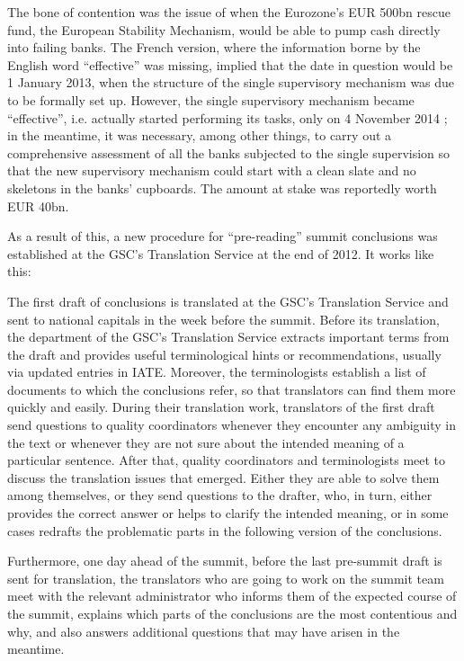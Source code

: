 \documentclass[output=paper]{langsci/langscibook}
\begin{document}
The bone of contention was the issue of when the Eurozone's EUR 500bn rescue fund, the European Stability Mechanism, would be able to pump cash directly into failing banks. The French version, where the information borne by the English word “effective” was missing, implied that the date in question would be 1 January 2013, when the structure of the single supervisory mechanism was due to be formally set up. However, the single supervisory mechanism became “effective”, i.e. actually started performing its tasks, only on 4 November 2014 \citep{ECB2014}; in the meantime, it was necessary, among other things, to carry out a comprehensive assessment of all the banks subjected to the single supervision so that the new supervisory mechanism could start with a clean slate and no skeletons in the banks’ cupboards. The amount at stake was reportedly worth EUR 40bn.

As a result of this, a new procedure for “pre-reading” summit conclusions was established at the GSC's Translation Service at the end of 2012. It works like this:

The first draft of conclusions is translated at the GSC's Translation Service and sent to national capitals in the week before the summit. Before its translation, the  department of the GSC's Translation Service extracts important terms from the draft and provides useful terminological hints or recommendations, usually via updated entries in IATE. Moreover, the terminologists establish a list of documents to which the conclusions refer, so that translators can find them more quickly and easily. During their translation work, translators of the first draft send questions to quality coordinators whenever they encounter any ambiguity in the text or whenever they are not sure about the intended meaning of a particular sentence. After that, quality coordinators and terminologists meet to discuss the translation issues that emerged. Either they are able to solve them among themselves, or they send questions to the drafter, who, in turn, either provides the correct answer or helps to clarify the intended meaning, or in some cases redrafts the problematic parts in the following version of the conclusions.

Furthermore, one day ahead of the summit, before the last pre-summit draft is sent for translation, the translators who are going to work on the summit team meet with the relevant administrator who informs them of the expected course of the summit, explains which parts of the conclusions are the most contentious and why, and also answers additional questions that may have arisen in the meantime.
\end{document}
